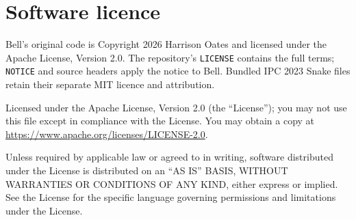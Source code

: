 \documentclass[10pt,a4paper,twocolumn]{article}
\begin{document}
\appendix
\section{Software licence}
Bell's original code is Copyright 2026 Harrison Oates and licensed under the
Apache License, Version 2.0. The repository's \texttt{LICENSE} contains the full
terms; \texttt{NOTICE} and source headers apply the notice to Bell. Bundled IPC
2023 Snake files retain their separate MIT licence and attribution.

Licensed under the Apache License, Version 2.0 (the \textquotedblleft License\textquotedblright);
you may not use this file except in compliance with the License. You may obtain
a copy at \url{https://www.apache.org/licenses/LICENSE-2.0}.

Unless required by applicable law or agreed to in writing, software distributed
under the License is distributed on an \textquotedblleft AS IS\textquotedblright{}
BASIS, WITHOUT WARRANTIES OR CONDITIONS OF ANY KIND, either express or implied.
See the License for the specific language governing permissions and limitations
under the License.
\end{document}
